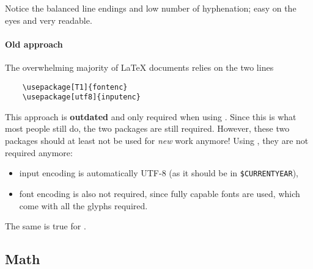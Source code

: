 Notice the balanced line endings and low number of hyphenation;
easy on the eyes and very readable.

\paragraph{Old approach}
The overwhelming majority of \LaTeX{} documents relies on the two lines
\begin{verbatim}
    \usepackage[T1]{fontenc}
    \usepackage[utf8]{inputenc}
\end{verbatim}
This approach is \textbf{outdated} and only required when using .
Since this is what most people still do, the two packages are still required.
However, these two packages should at least not be used for \emph{new} work anymore!
Using , they are not required anymore:
\begin{itemize}
    \item input encoding is automatically UTF-8 (as it should be in \verb|$CURRENTYEAR|),
    \item font encoding is also not required, since fully capable fonts are used,
        which come with all the glyphs required.
\end{itemize}
The same is true for .

\subsection{Math}


